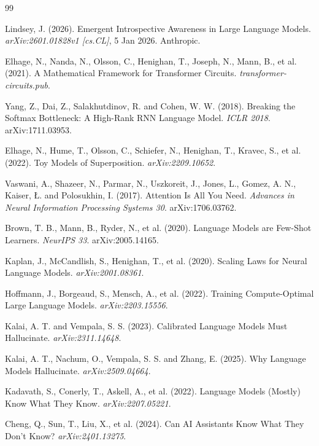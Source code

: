 
\begin{thebibliography}{99}

Lindsey, J. (2026). Emergent Introspective Awareness in Large Language Models.
\textit{arXiv:2601.01828v1 [cs.CL]}, 5 Jan 2026. Anthropic.

Elhage, N., Nanda, N., Olsson, C., Henighan, T., Joseph, N., Mann, B., et al. (2021).
A Mathematical Framework for Transformer Circuits. \textit{transformer-circuits.pub}.

Yang, Z., Dai, Z., Salakhutdinov, R. and Cohen, W. W. (2018). Breaking the Softmax
Bottleneck: A High-Rank RNN Language Model. \textit{ICLR 2018}. arXiv:1711.03953.

Elhage, N., Hume, T., Olsson, C., Schiefer, N., Henighan, T., Kravec, S., et al. (2022).
Toy Models of Superposition. \textit{arXiv:2209.10652}.

Vaswani, A., Shazeer, N., Parmar, N., Uszkoreit, J., Jones, L., Gomez, A. N.,
Kaiser, {\L}. and Polosukhin, I. (2017). Attention Is All You Need.
\textit{Advances in Neural Information Processing Systems 30}. arXiv:1706.03762.

Brown, T. B., Mann, B., Ryder, N., et al. (2020). Language Models are Few-Shot
Learners. \textit{NeurIPS 33}. arXiv:2005.14165.

Kaplan, J., McCandlish, S., Henighan, T., et al. (2020). Scaling Laws for Neural
Language Models. \textit{arXiv:2001.08361}.

Hoffmann, J., Borgeaud, S., Mensch, A., et al. (2022). Training Compute-Optimal
Large Language Models. \textit{arXiv:2203.15556}.

Kalai, A. T. and Vempala, S. S. (2023). Calibrated Language Models Must
Hallucinate. \textit{arXiv:2311.14648}.

Kalai, A. T., Nachum, O., Vempala, S. S. and Zhang, E. (2025). Why Language
Models Hallucinate. \textit{arXiv:2509.04664}.

Kadavath, S., Conerly, T., Askell, A., et al. (2022). Language Models (Mostly)
Know What They Know. \textit{arXiv:2207.05221}.

Cheng, Q., Sun, T., Liu, X., et al. (2024). Can AI Assistants Know What They
Don't Know? \textit{arXiv:2401.13275}.


\end{thebibliography}
